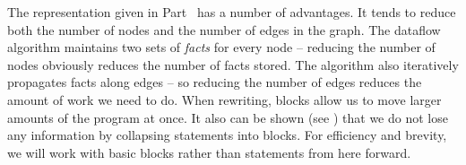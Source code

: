 The representation given in Part~ has a number of
advantages. It tends to reduce both the number of nodes and the number
of edges in the graph. The dataflow algorithm maintains two sets of
\emph{facts} for every node -- reducing the number of nodes obviously
reduces the number of facts stored. The algorithm also iteratively
propagates facts along edges -- so reducing the number of edges
reduces the amount of work we need to do. When rewriting, blocks allow
us to move larger amounts of the program at once. It also can be shown
(see \citep{AhoXX}) that we do not lose any information by collapsing
statements into blocks. For efficiency and brevity, we will work with
basic blocks rather than statements from here forward.

